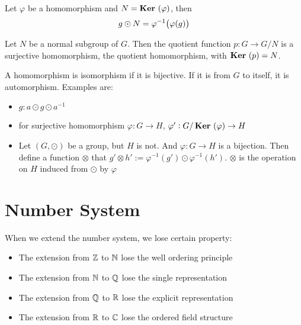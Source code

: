 \begin{theorem}
Let $\varphi$ be a homomorphism and $N = \displaystyle \mathop{\bf Ker\/}~( \varphi )$, then
\begin{equation}
    g \odot N = \varphi^{-1}\mleft(\varphi(g)\mright)
\end{equation}
\end{theorem}

\begin{theorem}
    Let $N$ be a normal subgroup of $G$. Then the quotient function $p: G \rightarrow G/N$ is a surjective homomorphism, the quotient homomorphism, with $\displaystyle \mathop{\bf Ker\/}~( p ) = N$.
\end{theorem}


\begin{definition}
    A homomorphism is isomorphism if it is bijective. If it is from $G$ to itself, it is automorphism. Examples are:
    \begin{itemize}
        \item $g: a \odot g \odot a^{-1}$
        \item for surjective homomorphism $\varphi: G \rightarrow H$, $\varphi' : G/\displaystyle \mathop{\bf Ker\/}~( \varphi ) \rightarrow H$
        \item Let $(G, \odot)$ be a group, but $H$ is not. And $\varphi: G \rightarrow H$ is a bijection. Then define a function $\otimes$ that $g' \otimes h' := \varphi^{-1}(g') \odot \varphi^{-1}(h')$. $\otimes$ is the operation on $H$ induced from $\odot$ by $\varphi$
    \end{itemize}
\end{definition}



\section{Number System}

When we extend the number system, we lose certain property:
\begin{itemize}
    \item The extension from $\mathbb{Z}$ to $\mathbb{N}$ lose the well ordering principle
    \item The extension from $\mathbb{N}$ to $\mathbb{Q}$ lose the single representation
    \item The extension from $\mathbb{Q}$ to $\mathbb{R}$ lose the explicit representation
    \item The extension from $\mathbb{R}$ to $\mathbb{C}$ lose the ordered field structure
\end{itemize}

